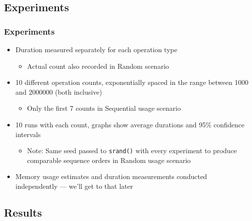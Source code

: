 \documentclass{beamer}
\begin{document}
\subsection{Experiments}


\begin{frame}
\frametitle{Experiments}
\begin{itemize}

  \item Duration measured separately for each operation type
  \begin{itemize}
    \item Actual count also recorded in Random scenario
  \end{itemize}

  \item 10 different operation counts, exponentially spaced in the range between
  1000 and 2000000 (both inclusive)

  \begin{itemize}

    \item Only the first 7 counts in Sequential usage scenario

  \end{itemize}

  \item 10 runs with each count, graphs show average durations and 95\%
  confidence intervals

  \begin{itemize}

    \item Note: Same seed passed to \texttt{srand()} with every experiment to
    produce comparable sequence orders in Random usage scenario

  \end{itemize}

  \item Memory usage estimates and duration measurements conducted independently
  --- we'll get to that later

\end{itemize}
\end{frame}

\subsection{Results}
\end{document}
